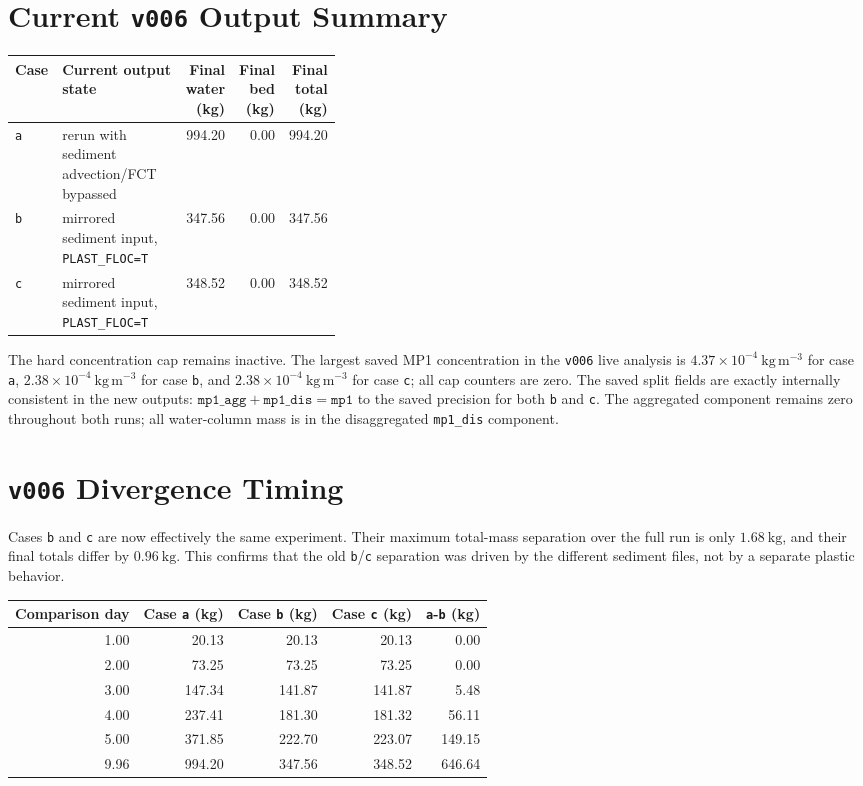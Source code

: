 \documentclass[11pt]{article}
\begin{document}
\section*{Current \texttt{v006} Output Summary}
\begin{table}[h]
\centering
\small
\begin{tabular}{lp{0.38\linewidth}rrr}
\toprule
Case & Current output state & Final water (kg) & Final bed (kg) &
Final total (kg) \\
\midrule
\texttt{a} & rerun with sediment advection/FCT bypassed & 994.20 & 0.00 &
994.20 \\
\texttt{b} & mirrored sediment input, \texttt{PLAST\_FLOC=T} & 347.56 & 0.00 &
347.56 \\
\texttt{c} & mirrored sediment input, \texttt{PLAST\_FLOC=T} & 348.52 & 0.00 &
348.52 \\
\bottomrule
\end{tabular}
\end{table}

The hard concentration cap remains inactive.  The largest saved MP1
concentration in the \texttt{v006} live analysis is
\(4.37\times10^{-4}~\mathrm{kg\,m^{-3}}\) for case \texttt{a},
\(2.38\times10^{-4}~\mathrm{kg\,m^{-3}}\) for case \texttt{b}, and
\(2.38\times10^{-4}~\mathrm{kg\,m^{-3}}\) for case \texttt{c}; all cap counters
are zero.  The saved split fields are exactly internally consistent in the new
outputs: \(\texttt{mp1\_agg}+\texttt{mp1\_dis}=\texttt{mp1}\) to the saved
precision for both \texttt{b} and \texttt{c}.  The aggregated component remains
zero throughout both runs; all water-column mass is in the disaggregated
\texttt{mp1\_dis} component.

\section*{\texttt{v006} Divergence Timing}
Cases \texttt{b} and \texttt{c} are now effectively the same experiment.  Their
maximum total-mass separation over the full run is only \(1.68~\mathrm{kg}\),
and their final totals differ by \(0.96~\mathrm{kg}\).  This confirms that the
old \texttt{b}/\texttt{c} separation was driven by the different sediment files,
not by a separate plastic behavior.

\begin{table}[h]
\centering
\small
\begin{tabular}{rrrrr}
\toprule
Comparison day & Case \texttt{a} (kg) & Case \texttt{b} (kg) &
Case \texttt{c} (kg) & \texttt{a}-\texttt{b} (kg) \\
\midrule
1.00 & 20.13 & 20.13 & 20.13 & 0.00 \\
2.00 & 73.25 & 73.25 & 73.25 & 0.00 \\
3.00 & 147.34 & 141.87 & 141.87 & 5.48 \\
4.00 & 237.41 & 181.30 & 181.32 & 56.11 \\
5.00 & 371.85 & 222.70 & 223.07 & 149.15 \\
9.96 & 994.20 & 347.56 & 348.52 & 646.64 \\
\bottomrule
\end{tabular}
\end{table}
\end{document}
